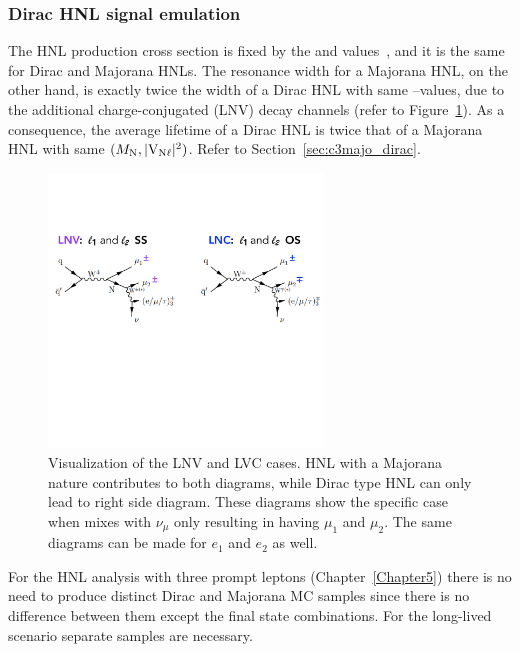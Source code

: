 \subsubsection{Dirac HNL signal emulation}\label{sec:c4diracmajo}
The HNL production cross section is fixed by the \mhnl and \mixpar
values~\cite{Degrande_2016,heavyN}, and it is the same for Dirac and
Majorana HNLs.
The resonance width for a Majorana HNL, on the other hand, is exactly
twice the width of a Dirac HNL with same \mhnl--\mixpar values, due to
the additional charge-conjugated (LNV) decay channels (refer to Figure~\ref{fig:dirac_majo}).
As a consequence, the average lifetime of a Dirac HNL is twice that of
a Majorana HNL with same $(M_{\mathrm{N}},\mathrm{|V_{\mathrm{N}\ell}|^2})$. Refer
to Section~\ref{sec:c3majo_dirac}.
\begin{figure}[h!]
\centering
 \includegraphics[clip,trim=0cm 7cm 0cm 3cm, width=0.65\textwidth]{Figures/c4/dirac_majo2}
  \caption{Visualization of the LNV and LVC cases. HNL with a Majorana
    nature contributes to both diagrams, while Dirac type HNL can only
    lead to right side diagram. These diagrams show the specific case
    when \hnl mixes with $\nu_\mu$ only resulting in having $\mu_{1}$
    and $\mu_{2}$. The same diagrams can be made for $e_{1}$
    and $e_{2}$ as well.}
  \label{fig:dirac_majo}
\end{figure}

For the HNL analysis with three prompt leptons (Chapter~\ref{Chapter5}) there is no 
need to produce distinct Dirac and Majorana MC samples since there is
no difference between them except the final state combinations. For the
long-lived scenario separate samples are necessary.

